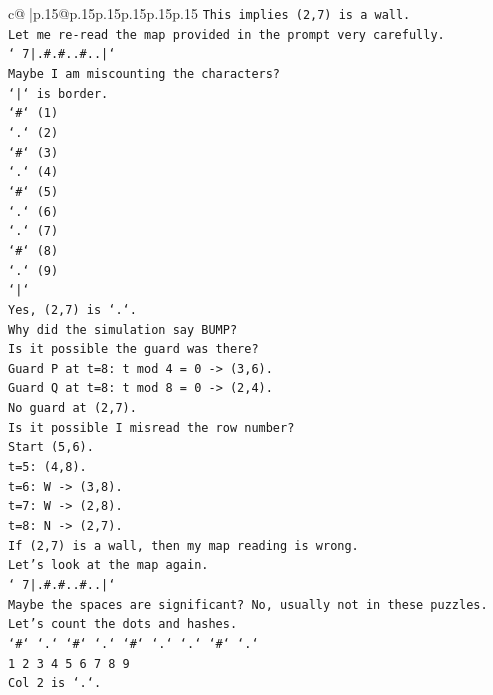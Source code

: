 \documentclass{article}
\begin{document}
{\begin{supertabular}{c@{$\;$}|p{.15\linewidth}@{}p{.15\linewidth}p{.15\linewidth}p{.15\linewidth}p{.15\linewidth}p{.15\linewidth}}
{{{\texttt{This implies (2,7) is a wall.} \\
\texttt{Let me re{-}read the map provided in the prompt very carefully.} \\
\texttt{` 7|.\#.\#..\#..|`} \\
\texttt{Maybe I am miscounting the characters?} \\
\texttt{`|` is border.} \\
\texttt{`\#` (1)} \\
\texttt{`.` (2)} \\
\texttt{`\#` (3)} \\
\texttt{`.` (4)} \\
\texttt{`\#` (5)} \\
\texttt{`.` (6)} \\
\texttt{`.` (7)} \\
\texttt{`\#` (8)} \\
\texttt{`.` (9)} \\
\texttt{`|`} \\
\texttt{Yes, (2,7) is `.`.} \\
\texttt{Why did the simulation say BUMP?} \\
\texttt{Is it possible the guard was there?} \\
\texttt{Guard P at t=8: t mod 4 = 0 {-}> (3,6).} \\
\texttt{Guard Q at t=8: t mod 8 = 0 {-}> (2,4).} \\
\texttt{No guard at (2,7).} \\
\texttt{Is it possible I misread the row number?} \\
\texttt{Start (5,6).} \\
\texttt{t=5: (4,8).} \\
\texttt{t=6: W {-}> (3,8).} \\
\texttt{t=7: W {-}> (2,8).} \\
\texttt{t=8: N {-}> (2,7).} \\
\texttt{If (2,7) is a wall, then my map reading is wrong.} \\
\texttt{Let's look at the map again.} \\
\texttt{` 7|.\#.\#..\#..|`} \\
\texttt{Maybe the spaces are significant? No, usually not in these puzzles.} \\
\texttt{Let's count the dots and hashes.} \\
\texttt{`\#` `.` `\#` `.` `\#` `.` `.` `\#` `.`} \\
\texttt{1 2 3 4 5 6 7 8 9} \\
\texttt{Col 2 is `.`.} \\
}}}
\end{supertabular}}
\end{document}
